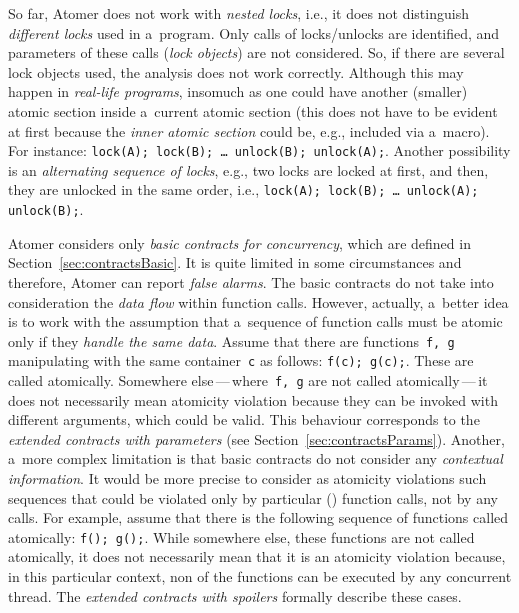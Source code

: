 So far, Atomer does not work with \emph{nested locks}, i.e., it does not
distinguish \emph{different locks} used in a~program. Only calls of
locks/unlocks are identified, and parameters of these calls (\emph{lock
objects}) are not considered. So, if there are several lock objects used, the
analysis does not work correctly. Although this may happen in \emph{real-life
programs}, insomuch as one could have another (smaller) atomic section inside
a~current atomic section (this does not have to be evident at first because
the \emph{inner atomic section} could be, e.g., included via a~macro). For
instance: \texttt{lock(A); lock(B); \ldots\ unlock(B); unlock(A);}. Another
possibility is an \emph{alternating sequence of locks}, e.g., two locks are
locked at first, and then, they are unlocked in the same order, i.e.,
\texttt{lock(A); lock(B); \ldots\ unlock(A); unlock(B);}.

Atomer considers only \emph{basic contracts for concurrency}, which are defined
in Section~\ref{sec:contractsBasic}. It is quite limited in some circumstances
and therefore, Atomer can report \emph{false alarms}. The basic contracts do
not take into consideration the \emph{data flow} within function calls.
However, actually, a~better idea is to work with the assumption that a~sequence
of function calls must be atomic only if they \emph{handle the same data}.
Assume that there are functions~\texttt{f, g} manipulating with the same
container~\texttt{c} as follows: \texttt{f(c); g(c);}. These are called
atomically. Somewhere else\,---\,where~\texttt{f, g} are not called
atomically\,---\,it does not necessarily mean atomicity violation because they
can be invoked with different arguments, which could be valid. This behaviour
corresponds to the \emph{extended contracts with parameters} (see
Section~\ref{sec:contractsParams}). Another, a~more complex limitation is that
basic contracts do not consider any \emph{contextual information}. It would be
more precise to consider as atomicity violations such sequences that could be
violated only by particular () function calls, not by any calls.
For example, assume that there is the following sequence of functions called
atomically: \texttt{f(); g();}. While somewhere else, these functions are not
called atomically, it does not necessarily mean that it is an atomicity
violation because, in this particular context, non of the 
functions can be executed by any concurrent thread. The \emph{extended
contracts with spoilers} formally describe these cases.

